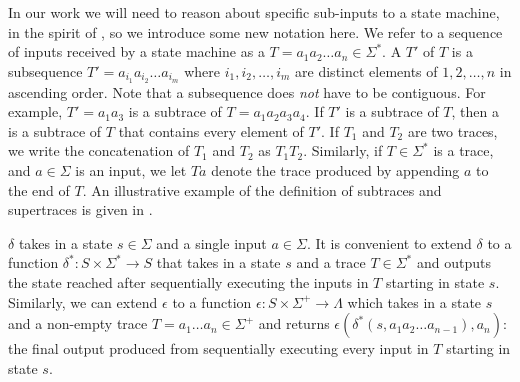 In our work we will need to reason about specific sub-inputs to a state machine, in the spirit of \whyprovenance{}, so we introduce some new notation here.
We refer to a sequence of inputs received by a state machine as a
 $T = a_1 a_2 \ldots a_n \in \Sigma^*$. A 
$T'$ of $T$ is a subsequence $T' = a_{i_1} a_{i_2} \ldots a_{i_m}$ where $i_1,
i_2, \ldots, i_m$ are distinct elements of $1, 2, \ldots, n$ in ascending
order. Note that a subsequence does \emph{not} have to be contiguous. For
example, $T' = a_1 a_3$ is a subtrace of $T = a_1 a_2 a_3 a_4$. If $T'$ is a
subtrace of $T$, then a  is a subtrace of
$T$ that contains every element of $T'$. If $T_1$ and $T_2$ are two traces, we
write the concatenation of $T_1$ and $T_2$ as $T_1T_2$. Similarly, if $T \in
\Sigma^*$ is a trace, and $a \in \Sigma$ is an input, we let $Ta$ denote the
trace produced by appending $a$ to the end of $T$. An illustrative example of
the definition of subtraces and supertraces is given in .

{}

$\delta$ takes in a state $s \in \Sigma$ and a single input $a \in \Sigma$.
It is convenient to extend $\delta$ to a function $\delta^*: S \times \Sigma^*
\to S$ that takes in a state $s$ and a trace $T \in \Sigma^*$ and outputs the
state reached after sequentially executing the inputs in $T$ starting in state
$s$. Similarly, we can extend $\epsilon$ to a function $\epsilon: S \times
\Sigma^+ \to \Lambda$ which takes in a state $s$ and a non-empty trace $T = a_1
\ldots a_n \in \Sigma^+$ and returns $\epsilon(\delta^*(s, a_1 a_2 \ldots
a_{n-1}), a_n)$: the final output produced from sequentially executing every
input in $T$ starting in state $s$.
